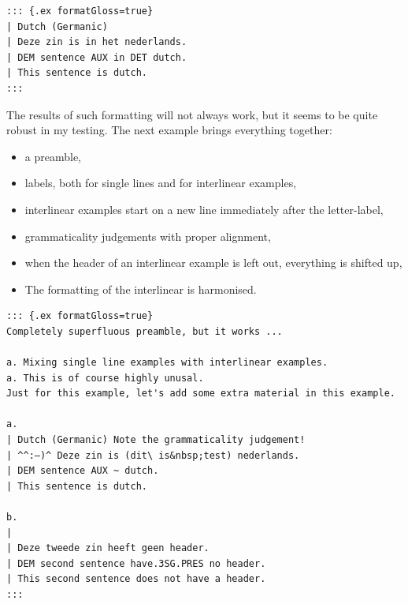 \documentclass[
]{article}
\providecommand{\tightlist}{%
  \setlength{\itemsep}{0pt}\setlength{\parskip}{0pt}}
\begin{document}
\begin{verbatim}
::: {.ex formatGloss=true}
| Dutch (Germanic)
| Deze zin is in het nederlands.
| DEM sentence AUX in DET dutch.
| This sentence is dutch.
:::
\end{verbatim}

\begin{samepage}
\begin{exe} \judgewidth{}
  \label{ex4.11}
\end{exe}
\end{samepage}

The results of such formatting will not always work, but it seems to be
quite robust in my testing. The next example brings everything together:

\begin{itemize}
\tightlist
\item
  a preamble,
\item
  labels, both for single lines and for interlinear examples,
\item
  interlinear examples start on a new line immediately after the
  letter-label,
\item
  grammaticality judgements with proper alignment,
\item
  when the header of an interlinear example is left out, everything is
  shifted up,
\item
  The formatting of the interlinear is harmonised.
\end{itemize}

\begin{verbatim}
::: {.ex formatGloss=true}
Completely superfluous preamble, but it works ...

a. Mixing single line examples with interlinear examples.
a. This is of course highly unusal.
Just for this example, let's add some extra material in this example.

a.
| Dutch (Germanic) Note the grammaticality judgement!
| ^^:–)^ Deze zin is (dit\ is&nbsp;test) nederlands.
| DEM sentence AUX ~ dutch.
| This sentence is dutch.

b.
|
| Deze tweede zin heeft geen header.
| DEM second sentence have.3SG.PRES no header.
| This second sentence does not have a header.
:::
\end{verbatim}
\end{document}

